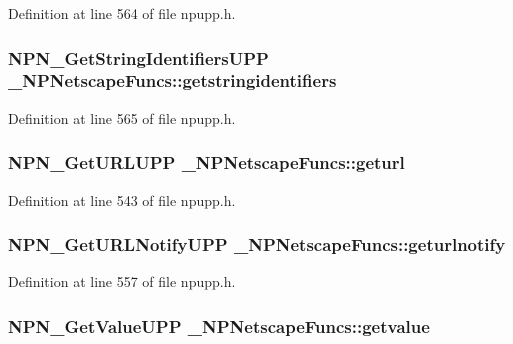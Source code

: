 Definition at line 564 of file npupp.h.

\hypertarget{struct___n_p_netscape_funcs_acd52b8aad9b9c097d7ef87e48843f3b8}{
\subsubsection[{getstringidentifiers}]{\setlength{\rightskip}{0pt plus 5cm}NPN\_\-GetStringIdentifiersUPP {\bf \_\-NPNetscapeFuncs::getstringidentifiers}}}
\label{struct___n_p_netscape_funcs_acd52b8aad9b9c097d7ef87e48843f3b8}


Definition at line 565 of file npupp.h.

\hypertarget{struct___n_p_netscape_funcs_ad4c72959fe044df64499e35f18991987}{
\subsubsection[{geturl}]{\setlength{\rightskip}{0pt plus 5cm}NPN\_\-GetURLUPP {\bf \_\-NPNetscapeFuncs::geturl}}}
\label{struct___n_p_netscape_funcs_ad4c72959fe044df64499e35f18991987}


Definition at line 543 of file npupp.h.

\hypertarget{struct___n_p_netscape_funcs_ae7f75d56c2d0608c7fcd638119d727ac}{
\subsubsection[{geturlnotify}]{\setlength{\rightskip}{0pt plus 5cm}NPN\_\-GetURLNotifyUPP {\bf \_\-NPNetscapeFuncs::geturlnotify}}}
\label{struct___n_p_netscape_funcs_ae7f75d56c2d0608c7fcd638119d727ac}


Definition at line 557 of file npupp.h.

\hypertarget{struct___n_p_netscape_funcs_a137b9d7552558dfddb1da2ba754ed073}{
\subsubsection[{getvalue}]{\setlength{\rightskip}{0pt plus 5cm}NPN\_\-GetValueUPP {\bf \_\-NPNetscapeFuncs::getvalue}}}
\label{struct___n_p_netscape_funcs_a137b9d7552558dfddb1da2ba754ed073}


